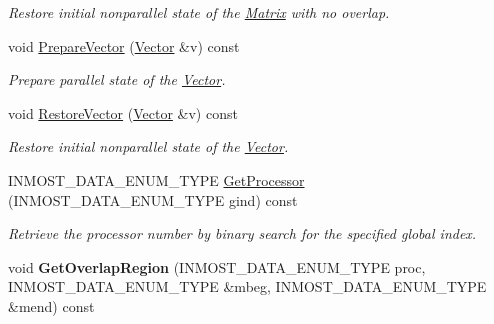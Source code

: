 \begin{DoxyCompactItemize}
\begin{DoxyCompactList}\small\item\em Restore initial nonparallel state of the \hyperlink{classINMOST_1_1Solver_1_1Matrix}{Matrix} with no overlap. \end{DoxyCompactList}\item 
\hypertarget{classINMOST_1_1Solver_1_1OrderInfo_ac5e96200d538f423e778f72fdde35501}{void \hyperlink{classINMOST_1_1Solver_1_1OrderInfo_ac5e96200d538f423e778f72fdde35501}{Prepare\-Vector} (\hyperlink{classINMOST_1_1Solver_1_1Vector}{Vector} \&v) const }\label{classINMOST_1_1Solver_1_1OrderInfo_ac5e96200d538f423e778f72fdde35501}

\begin{DoxyCompactList}\small\item\em Prepare parallel state of the \hyperlink{classINMOST_1_1Solver_1_1Vector}{Vector}. \end{DoxyCompactList}\item 
\hypertarget{classINMOST_1_1Solver_1_1OrderInfo_ac01e678d820b3461f6efedbc2adff276}{void \hyperlink{classINMOST_1_1Solver_1_1OrderInfo_ac01e678d820b3461f6efedbc2adff276}{Restore\-Vector} (\hyperlink{classINMOST_1_1Solver_1_1Vector}{Vector} \&v) const }\label{classINMOST_1_1Solver_1_1OrderInfo_ac01e678d820b3461f6efedbc2adff276}

\begin{DoxyCompactList}\small\item\em Restore initial nonparallel state of the \hyperlink{classINMOST_1_1Solver_1_1Vector}{Vector}. \end{DoxyCompactList}\item 
\hypertarget{classINMOST_1_1Solver_1_1OrderInfo_a620b59195a4bfa6a742e63d926b887a6}{I\-N\-M\-O\-S\-T\-\_\-\-D\-A\-T\-A\-\_\-\-E\-N\-U\-M\-\_\-\-T\-Y\-P\-E \hyperlink{classINMOST_1_1Solver_1_1OrderInfo_a620b59195a4bfa6a742e63d926b887a6}{Get\-Processor} (I\-N\-M\-O\-S\-T\-\_\-\-D\-A\-T\-A\-\_\-\-E\-N\-U\-M\-\_\-\-T\-Y\-P\-E gind) const }\label{classINMOST_1_1Solver_1_1OrderInfo_a620b59195a4bfa6a742e63d926b887a6}

\begin{DoxyCompactList}\small\item\em Retrieve the processor number by binary search for the specified global index. \end{DoxyCompactList}\item 
\hypertarget{classINMOST_1_1Solver_1_1OrderInfo_a4ce42a0cb98cef16a89ad959009f6abd}{void {\bfseries Get\-Overlap\-Region} (I\-N\-M\-O\-S\-T\-\_\-\-D\-A\-T\-A\-\_\-\-E\-N\-U\-M\-\_\-\-T\-Y\-P\-E proc, I\-N\-M\-O\-S\-T\-\_\-\-D\-A\-T\-A\-\_\-\-E\-N\-U\-M\-\_\-\-T\-Y\-P\-E \&mbeg, I\-N\-M\-O\-S\-T\-\_\-\-D\-A\-T\-A\-\_\-\-E\-N\-U\-M\-\_\-\-T\-Y\-P\-E \&mend) const }\label{classINMOST_1_1Solver_1_1OrderInfo_a4ce42a0cb98cef16a89ad959009f6abd}


\end{DoxyCompactItemize}
